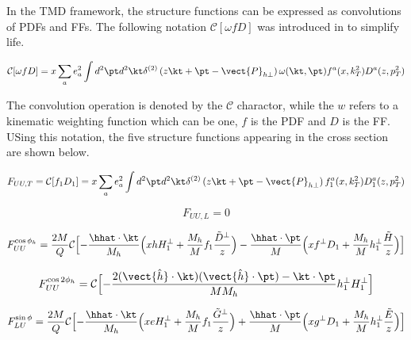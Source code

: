 In the TMD framework, the structure functions can be expressed as convolutions of PDFs and FFs.  The following notation $\mathcal{C}[\omega f D]$ was introduced in \cite{tmds-bacchetta:2006} to simplify life.

\begin{equation}
  \mathcal{C}[\omega f D] = x \sum_{a} e^{2}_{a} \int d^{2}\pt d^{2}\kt \delta^{(2)} \left( z\kt + \pt - \vect{P}_{h\perp} \right) \omega (\kt, \pt) f^{a}(x, k_{T}^{2}) D^{a}(z, p_{T}^{2}) 
\end{equation}

The convolution operation is denoted by the $\mathcal{C}$ charactor, while the $w$ refers to a kinematic weighting function which can be one, $f$ is the PDF and $D$ is the FF.  USing this notation, the five structure functions appearing in the cross section are shown below.

\begin{equation}
F_{UU,T} = \mathcal{C}[f_1 D_1] = x \sum_{a} e^{2}_{a} \int d^{2} \pt d^{2} \kt \delta^{(2)} \left( z\kt + \pt - \vect{P}_{h\perp} \right) f_{1}^{a}(x, k_{T}^{2}) D_{1}^{a}(z, p_{T}^{2})
\end{equation}

\begin{equation}
F_{UU,L} = 0
\end{equation}

\begin{equation}
F_{UU}^{\cos \phi_h} = \frac{2M}{Q} \mathcal{C} \Bigl[ - \frac{\hhat \cdot \kt}{M_h} \Bigl( x h H_{1}^{\perp} + \frac{M_h}{M} f_1 \frac{\tilde{D}^{\perp}}{z} \Bigr) - \frac{\hhat \cdot \pt}{M} \Bigl( x f^{\perp} D_1 + \frac{M_h}{M} h_1^{\perp} \frac{\tilde{H}}{z} \Bigr)\Bigr]
\end{equation}

\begin{equation}
F_{UU}^{\cos 2\phi_h} = \mathcal{C} \Bigl[ - \frac{2 (\vect{\hat{h}} \cdot \kt) (\vect{\hat{h}} \cdot \pt) - \kt \cdot \pt}{M M_h} h_{1}^{\perp} H_{1}^{\perp} \Bigr]
\end{equation}

\begin{equation}
  F_{LU}^{\sin\phi} = \frac{2M}{Q} \mathcal{C} \Bigl[ -\frac{\hhat \cdot \kt}{M_h} \Bigl( xeH_1^\perp + \frac{M_h}{M} f_1 \frac{\tilde{G}^\perp}{z} \Bigr) + \frac{\hhat \cdot \pt}{M} \Bigl( xg^\perp D_1 + \frac{M_h}{M} h_{1}^{\perp} \frac{\tilde{E}}{z} \Bigr) \Bigr]
\end{equation}


